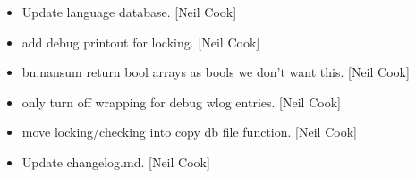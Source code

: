 \documentclass[a4paper,10pt,english]{report}
\begin{document}
\begin{itemize}
\item {} 
Update language database. {[}Neil Cook{]}

\item {} 
 \sphinxhyphen{} add debug printout for locking. {[}Neil Cook{]}

\item {} 
 \sphinxhyphen{} bn.nansum return bool arrays as bools we don’t
want this. {[}Neil Cook{]}

\item {} 
 \sphinxhyphen{} only turn off wrapping for debug wlog entries.
{[}Neil Cook{]}

\item {} 
 \sphinxhyphen{} move locking/checking into copy db file
function. {[}Neil Cook{]}

\item {} 
Update changelog.md. {[}Neil Cook{]}

\end{itemize}
\end{document}
